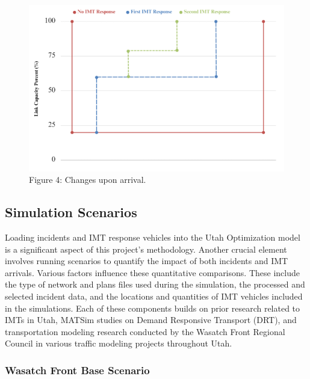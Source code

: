 \documentclass[
  letterpaper,
  authoryear]{elsarticle}
\begin{document}
\begin{figure}

{\centering \includegraphics{figures/fig4.png}

}

\caption{Figure 4: Changes upon arrival.}

\end{figure}

\hypertarget{simulation-scenarios}{%
\subsection{Simulation Scenarios}\label{simulation-scenarios}}

Loading incidents and IMT response vehicles into the Utah Optimization
model is a significant aspect of this project's methodology. Another
crucial element involves running scenarios to quantify the impact of
both incidents and IMT arrivals. Various factors influence these
quantitative comparisons. These include the type of network and plans
files used during the simulation, the processed and selected incident
data, and the locations and quantities of IMT vehicles included in the
simulations. Each of these components builds on prior research related
to IMTs in Utah, MATSim studies on Demand Responsive Transport (DRT),
and transportation modeling research conducted by the Wasatch Front
Regional Council in various traffic modeling projects throughout Utah.

\hypertarget{wasatch-front-base-scenario}{%
\subsubsection{Wasatch Front Base
Scenario}\label{wasatch-front-base-scenario}}
\end{document}
